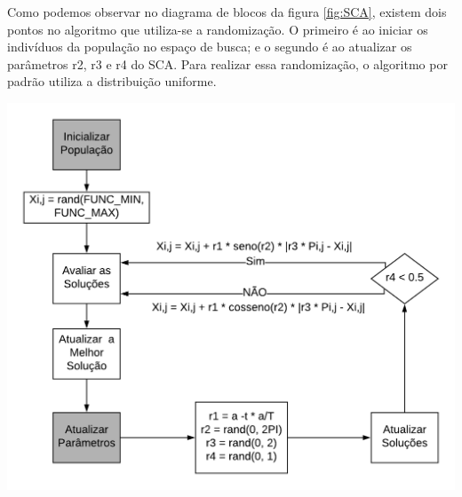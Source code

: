 Como podemos observar no diagrama de blocos da figura \ref{fig:SCA}, existem dois pontos no algoritmo que utiliza-se a randomização. O primeiro é ao iniciar os indivíduos da população no espaço de busca; e o segundo é ao atualizar os parâmetros r2, r3 e r4 do SCA. Para realizar essa randomização, o algoritmo por padrão utiliza a distribuição uniforme.

{
    \centering
    \includegraphics[width=0.7\linewidth]{figuras/Diagrama_SCA.png}
    \label{fig:SCA}
}






